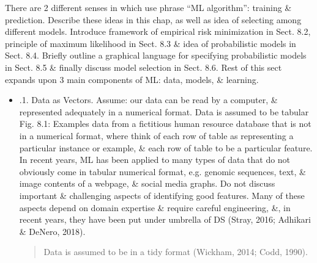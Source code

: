 \documentclass{article}
\begin{document}
\begin{enumerate}
\begin{itemize}
\begin{itemize}
			There are 2 different senses in which use phrase ``ML algorithm'': training \& prediction. Describe these ideas in this chap, as well as idea of selecting among different models. Introduce framework of empirical risk minimization in Sect. 8.2, principle of maximum likelihood in Sect. 8.3 \& idea of probabilistic models in Sect. 8.4. Briefly outline a graphical language for specifying probabilistic models in Sect. 8.5 \& finally discuss model selection in Sect. 8.6. Rest of this sect expands upon 3 main components of ML: data, models, \& learning.
			\begin{itemize}
				\item {.1. Data as Vectors.} Assume: our data can be read by a computer, \& represented adequately in a numerical format. Data is assumed to be tabular {\sf Fig. 8.1: Examples data from a fictitious human resource database that is not in a numerical format}, where think of each row of table as representing a particular instance or example, \& each row of table to be a particular feature. In recent years, ML has been applied to many types of data that do not obviously come in tabular numerical format, e.g. genomic sequences, text, \& image contents of a webpage, \& social media graphs. Do not discuss important \& challenging aspects of identifying good features. Many of these aspects depend on domain expertise \& require careful engineering, \&, in recent years, they have been put under umbrella of DS (Stray, 2016; Adhikari  \& DeNero, 2018).				
				\begin{quote}
					Data is assumed to be in a tidy format (Wickham, 2014; Codd, 1990).
				\end{quote}

\end{itemize}
\end{itemize}
\end{itemize}
\end{enumerate}
\end{document}

